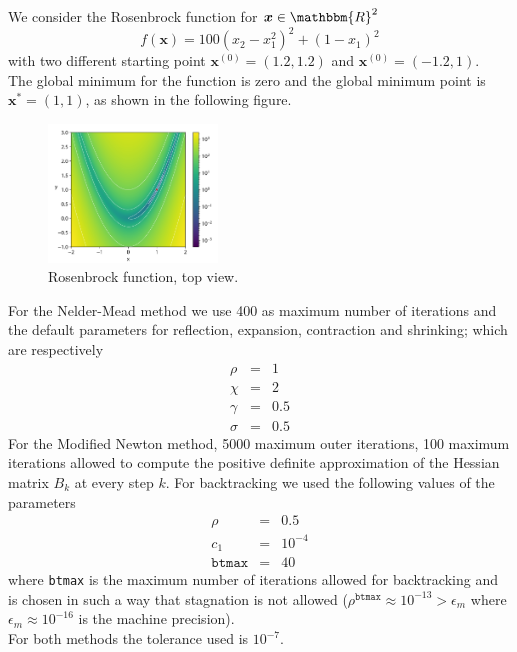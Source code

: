 
We consider the Rosenbrock function for $\boldsymbol{x} \in \mathbbm{R}^2$
\begin{equation*}
    f(\boldsymbol{x})=100(x_2-x_1^2)^2+(1-x_1)^2
\end{equation*}
with two different starting point $\boldsymbol{x}^{(0)}=(1.2,1.2)$ and $\boldsymbol{x}^{(0)}=(-1.2,1)$.
\\
The global minimum for the function is zero and the global minimum
point is $\boldsymbol{x^*}=(1,1)$, as shown in the following figure.

\begin{figure}[H]
    \centering
    \includegraphics[width=0.4\textwidth]{img/es2_function.png}
    \caption{Rosenbrock function, top view.} 
    \label{pb 2 graph}
\end{figure}

For the Nelder-Mead method we use 400 as maximum number of iterations and the default parameters 
for reflection, expansion, contraction and shrinking; which are respectively
\begin{eqnarray*}
    \rho &=& 1 \\
    \chi &=& 2 \\
    \gamma &=& 0.5 \\
    \sigma &=& 0.5
\end{eqnarray*}
For the Modified Newton method, 5000 maximum outer iterations, 100 maximum iterations allowed to 
compute the positive definite approximation of the Hessian matrix $B_k$ at every step $k$. For backtracking we used the following values of the parameters 
\begin{eqnarray*}
    \rho &=& 0.5 \\
    c_1 &=& 10^{-4} \\
    \texttt{btmax} &=& 40
\end{eqnarray*}
where \texttt{btmax} is the maximum number of iterations allowed for backtracking and is chosen 
in such a way that stagnation is not allowed ($\rho^{\texttt{btmax}}\approx 10^{-13}>\epsilon_m$ 
where $\epsilon_m \approx 10^{-16}$ is the machine precision).
\\
For both methods the tolerance used is $10^{-7}$.

